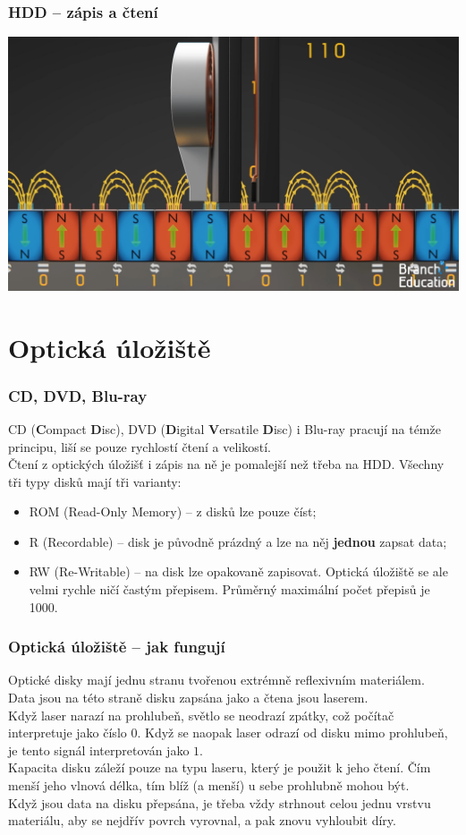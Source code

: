 \documentclass[aspectratio=169,11pt,svgnames,handout]{beamer}
\begin{document}
\begin{frame}
 \frametitle{HDD -- zápis a čtení}
 \begin{center}
  \includegraphics[width=.8\textwidth]{hdd_reading}
 \end{center}
\end{frame}

\section{Optická úložiště}

\begin{frame}
 \frametitle{CD, DVD, Blu-ray}
 CD (\textbf{C}ompact \textbf{D}isc), DVD (\textbf{D}igital \textbf{V}ersatile
 \textbf{D}isc) i Blu-ray pracují na témže principu, liší se pouze rychlostí
 čtení a velikostí.\\
 \pause
 Čtení z optických úložišť i zápis na ně je pomalejší než třeba na HDD.
 \pause
 Všechny tři typy disků mají tři varianty:
 \begin{itemize}[label=\textbullet]
  \item ROM (Read-Only Memory) -- z disků lze pouze číst;
  \item R (Recordable) -- disk je původně prázdný a lze na něj \textbf{jednou}
   zapsat data;
  \item RW (Re-Writable) -- na disk lze opakovaně zapisovat. Optická úložiště se
   ale velmi rychle ničí častým přepisem. Průměrný maximální počet přepisů je
   1000.
 \end{itemize}
\end{frame}

\begin{frame}
 \frametitle{Optická úložiště -- jak fungují}
 Optické disky mají jednu stranu tvořenou extrémně reflexivním materiálem.\\
 \pause
 Data jsou na této straně disku zapsána jako  a čtena jsou
 laserem.\\
 \pause
 Když laser narazí na prohlubeň, světlo se neodrazí zpátky, což počítač
 interpretuje jako číslo $0$. Když se naopak laser odrazí od disku mimo
 prohlubeň, je tento signál interpretován jako $1$.\\
 \pause
 Kapacita disku záleží pouze na typu laseru, který je použit k jeho čtení. Čím
 menší jeho vlnová délka, tím blíž (a menší) u sebe prohlubně mohou být.\\
 \pause
 Když jsou data na disku přepsána, je třeba vždy strhnout celou jednu vrstvu
 materiálu, aby se nejdřív povrch vyrovnal, a pak znovu vyhloubit díry.
\end{frame}
\end{document}
